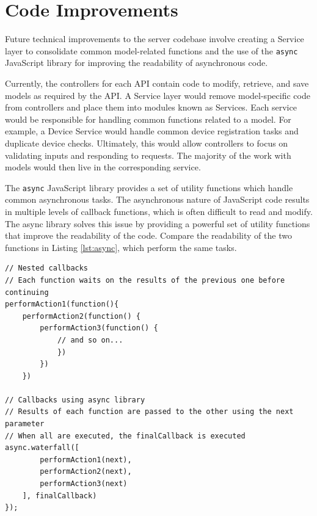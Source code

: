 \section{Code Improvements}

Future technical improvements to the server codebase involve creating a Service layer to consolidate common model-related functions and the use of the \texttt{async} JavaScript library for improving the readability of asynchronous code. 

Currently, the controllers for each API contain code to modify, retrieve, and save models as required by the API. A Service layer would remove model-specific code from controllers and place them into modules known as Services. Each service would be responsible for handling common functions related to a model. For example, a Device Service would handle common device registration tasks and duplicate device checks. Ultimately, this would allow controllers to focus on validating inputs and responding to requests. The majority of the work with models would then live in the corresponding service.

The \texttt{async} JavaScript library provides a set of utility functions which handle common asynchronous tasks. The asynchronous nature of JavaScript code results in multiple levels of callback functions, which is often difficult to read and modify. The async library solves this issue by providing a powerful set of utility functions that improve the readability of the code. Compare the readability of the two functions in Listing \ref{lst:async}, which perform the same tasks. 

\medskip
\begin{lstlisting}[caption={[Typical Nested Code vs \texttt{async} library]Comparison between normal callback code and \texttt{async} code}, label={lst:async}]
// Nested callbacks
// Each function waits on the results of the previous one before continuing
performAction1(function(){
	performAction2(function() {
		performAction3(function() {
			// and so on...
			})
		})
	})

// Callbacks using async library
// Results of each function are passed to the other using the next parameter
// When all are executed, the finalCallback is executed
async.waterfall([
		performAction1(next), 
		performAction2(next),
		performAction3(next)
	], finalCallback)
});
\end{lstlisting}









